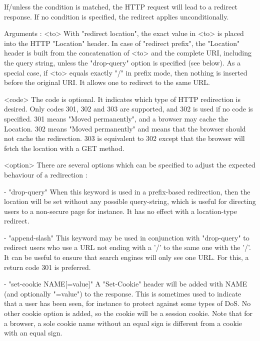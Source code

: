   If/unless the condition is matched, the HTTP request will lead to a redirect
  response. If no condition is specified, the redirect applies unconditionally.

  Arguments :
    <to>      With "redirect location", the exact value in <to> is placed into
              the HTTP "Location" header. In case of "redirect prefix", the
              "Location" header is built from the concatenation of <to> and the
              complete URI, including the query string, unless the "drop-query"
              option is specified (see below). As a special case, if <to>
              equals exactly "/" in prefix mode, then nothing is inserted
              before the original URI. It allows one to redirect to the same
              URL.

    <code>    The code is optional. It indicates which type of HTTP redirection
              is desired. Only codes 301, 302 and 303 are supported, and 302 is
              used if no code is specified. 301 means "Moved permanently", and
              a browser may cache the Location. 302 means "Moved permanently"
              and means that the browser should not cache the redirection. 303
              is equivalent to 302 except that the browser will fetch the
              location with a GET method.

    <option>  There are several options which can be specified to adjust the
              expected behaviour of a redirection :

      - "drop-query"
        When this keyword is used in a prefix-based redirection, then the
        location will be set without any possible query-string, which is useful
        for directing users to a non-secure page for instance. It has no effect
        with a location-type redirect.

      - "append-slash"
        This keyword may be used in conjunction with "drop-query" to redirect
        users who use a URL not ending with a '/' to the same one with the '/'.
        It can be useful to ensure that search engines will only see one URL.
        For this, a return code 301 is preferred.

      - "set-cookie NAME[=value]"
        A "Set-Cookie" header will be added with NAME (and optionally "=value")
        to the response. This is sometimes used to indicate that a user has
        been seen, for instance to protect against some types of DoS. No other
        cookie option is added, so the cookie will be a session cookie. Note
        that for a browser, a sole cookie name without an equal sign is
        different from a cookie with an equal sign.

